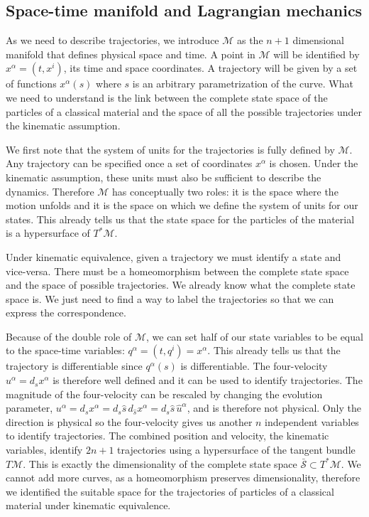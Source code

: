 \documentclass[smallextended]{svjour3}
\numberwithin{equation}{section}
\theoremstyle{definition}
\begin{document}
\subsection{Space-time manifold and Lagrangian mechanics}

As we need to describe trajectories, we introduce $\mathcal{M}$ as the $n+1$ dimensional manifold that defines physical space and time. A point in $\mathcal{M}$ will be identified by $x^\alpha = (t, x^i)$, its time and space coordinates. A trajectory will be given by a set of functions $x^\alpha(s)$ where $s$ is an arbitrary parametrization of the curve. What we need to understand is the link between the complete state space of the particles of a classical material and the space of all the possible trajectories under the kinematic assumption.

We first note that the system of units for the trajectories is fully defined by $\mathcal{M}$. Any trajectory can be specified once a set of coordinates $x^\alpha$ is chosen. Under the kinematic assumption, these units must also be sufficient to describe the dynamics. Therefore $\mathcal{M}$ has conceptually two roles: it is the space where the motion unfolds and it is the space on which we define the system of units for our states. This already tells us that the state space for the particles of the material is a hypersurface of $T^*\mathcal{M}$.

Under kinematic equivalence, given a trajectory we must identify a state and vice-versa. There must be a homeomorphism between the complete state space and the space of possible trajectories. We already know what the complete state space is. We just need to find a way to label the trajectories so that we can express the correspondence.

Because of the double role of $\mathcal{M}$, we can set half of our state variables to be equal to the space-time variables: $q^\alpha = (t, q^i) = x^\alpha$. This already tells us that the trajectory is differentiable since $q^\alpha(s)$ is differentiable. The four-velocity $u^\alpha = d_s x^\alpha$ is therefore well defined and it can be used to identify trajectories. The magnitude of the four-velocity can be rescaled by changing the evolution parameter, $u^\alpha = d_s x^\alpha = d_s \hat{s} \, d_{\hat{s}} x^\alpha = d_s \hat{s} \, \hat{u}^\alpha$, and is therefore not physical. Only the direction is physical so the four-velocity gives us another $n$ independent variables to identify trajectories. The combined position and velocity, the kinematic variables, identify $2n + 1$ trajectories using a hypersurface of the tangent bundle $T\mathcal{M}$. This is exactly the dimensionality of the complete state space $\bar{\mathcal{S}} \subset T^*\mathcal{M}$. We cannot add more curves, as a homeomorphism preserves dimensionality, therefore we identified the suitable space for the trajectories of particles of a classical material under kinematic equivalence.
\end{document}
